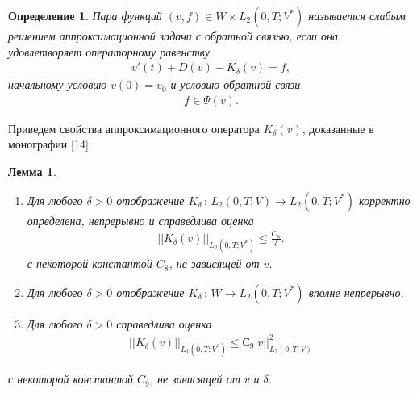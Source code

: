 \documentclass[14pt, a4paper]{extarticle}
\newtheorem{definition}{Определение}[section]
\newtheorem{lemma}{Лемма}[section]
\numberwithin{equation}{section}
\begin{document}
    \begin{definition}
        Пара функций $(v, f) \in W \times L_2(0,T;V^*)$ называется слабым решением
        аппроксимационной задачи с обратной связью, если она удовлетворяет операторному равенству
        \begin{equation}\label{eq:4.1}
            \begin{gathered}
                v'(t) + D(v) - K_\delta (v) = f,
            \end{gathered}
        \end{equation}
        начальному условию $v(0) = v_0$ и условию обратной связи
        \begin{equation}\label{eq:4.2}
            \begin{gathered}
                f \in \Psi(v).
            \end{gathered}
        \end{equation}
    \end{definition}

    Приведем свойства аппроксимационного оператора $K_\delta(v)$, доказанные в монографии [14]:
    \begin{lemma}
        \begin{enumerate} 
            \item Для любого $\delta > 0$ отображение $K_\delta\, : \,L_2(0,T;V) \rightarrow L_2(0,T;V^*)$
            корректно определена, непрерывно и справедлива оценка
            \begin{equation}\label{eq:4.3}
                \begin{gathered}
                    ||K_\delta(v)||_{L_2(0,T;V^*)} \leq \frac{C_8}{\delta}.
                \end{gathered}
            \end{equation}
            \noindent с некоторой константой $C_8$, не зависящей от $v$.
            \item Для любого $\delta > 0$ отображение $K_\delta\, : \, W \rightarrow L_2(0,T;V^*)$ вполне непрерывно.
            \item Для любого $\delta > 0$ справедлива оценка
            \begin{equation*}
                \begin{gathered}
                    ||K_\delta(v)||_{L_1(0,T;V^*)} \leq С_9 |v||^2_{L_2(0,T;V)}
                \end{gathered}
            \end{equation*}
        \end{enumerate}
        с некоторой константой $C_9$, не зависящей от $v$ и $\delta$.
    \end{lemma}
\end{document}
